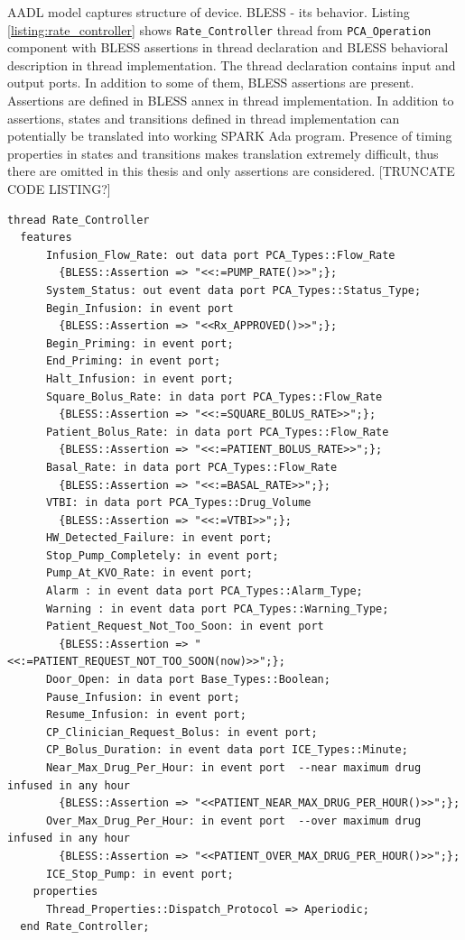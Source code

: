 AADL model captures structure of device. BLESS - its behavior. Listing \ref{listing:rate_controller} shows \lstinline{Rate_Controller} thread from \lstinline{PCA_Operation} component with BLESS assertions in thread declaration and BLESS behavioral description in thread implementation. The thread declaration contains input and output ports. In addition to some of them, BLESS assertions are present. Assertions are defined in BLESS annex in thread implementation. In addition to assertions, states and transitions defined in thread implementation can potentially be translated into working SPARK Ada program. Presence of timing properties in states and transitions makes translation extremely difficult, thus there are omitted in this thesis and only assertions are considered. [TRUNCATE CODE LISTING?]

\singlespacing
\begin{lstlisting}[language=aadl, frame=single, gobble=0, caption={\lstinline{Rate_Controller} thread from \lstinline{PCA_Operation} component with BLESS assertions}, label={listing:rate_controller}]
  thread Rate_Controller
  features
      Infusion_Flow_Rate: out data port PCA_Types::Flow_Rate
        {BLESS::Assertion => "<<:=PUMP_RATE()>>";};   
      System_Status: out event data port PCA_Types::Status_Type;
      Begin_Infusion: in event port
        {BLESS::Assertion => "<<Rx_APPROVED()>>";};  
      Begin_Priming: in event port;
      End_Priming: in event port;
      Halt_Infusion: in event port;
      Square_Bolus_Rate: in data port PCA_Types::Flow_Rate 
        {BLESS::Assertion => "<<:=SQUARE_BOLUS_RATE>>";};
      Patient_Bolus_Rate: in data port PCA_Types::Flow_Rate 
        {BLESS::Assertion => "<<:=PATIENT_BOLUS_RATE>>";};
      Basal_Rate: in data port PCA_Types::Flow_Rate 
        {BLESS::Assertion => "<<:=BASAL_RATE>>";};
      VTBI: in data port PCA_Types::Drug_Volume 
        {BLESS::Assertion => "<<:=VTBI>>";};
      HW_Detected_Failure: in event port;
      Stop_Pump_Completely: in event port; 
      Pump_At_KVO_Rate: in event port; 
      Alarm : in event data port PCA_Types::Alarm_Type;
      Warning : in event data port PCA_Types::Warning_Type;
      Patient_Request_Not_Too_Soon: in event port 
        {BLESS::Assertion => "<<:=PATIENT_REQUEST_NOT_TOO_SOON(now)>>";};  
      Door_Open: in data port Base_Types::Boolean;
      Pause_Infusion: in event port;
      Resume_Infusion: in event port;
      CP_Clinician_Request_Bolus: in event port;
      CP_Bolus_Duration: in event data port ICE_Types::Minute; 
      Near_Max_Drug_Per_Hour: in event port  --near maximum drug infused in any hour
        {BLESS::Assertion => "<<PATIENT_NEAR_MAX_DRUG_PER_HOUR()>>";};  
      Over_Max_Drug_Per_Hour: in event port  --over maximum drug infused in any hour
        {BLESS::Assertion => "<<PATIENT_OVER_MAX_DRUG_PER_HOUR()>>";};  
      ICE_Stop_Pump: in event port;
    properties
      Thread_Properties::Dispatch_Protocol => Aperiodic;
  end Rate_Controller;


\end{lstlisting}
